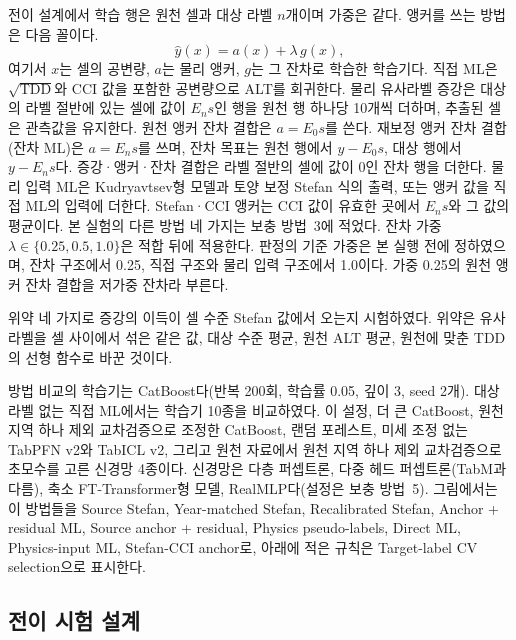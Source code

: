 전이 설계에서 학습 행은 원천 셀과 대상 라벨 $n$개이며 가중은 같다. 앵커를 쓰는 방법은 다음 꼴이다.
\begin{equation}
\hat{y}(x) = a(x) + \lambda\, g(x),
\label{eq:anchor}
\end{equation}
여기서 $x$는 셀의 공변량, $a$는 물리 앵커, $g$는 그 잔차로 학습한 학습기다. 직접 ML은 $\sqrt{\mathrm{TDD}}$와 CCI 값을 포함한 공변량으로 ALT를 회귀한다. 물리 유사라벨 증강은 대상의 라벨 절반에 있는 셀에 값이 $E_n s$인 행을 원천 행 하나당 10개씩 더하며, 추출된 셀은 관측값을 유지한다. 원천 앵커 잔차 결합은 $a = E_0 s$를 쓴다. 재보정 앵커 잔차 결합(잔차 ML)은 $a = E_n s$를 쓰며, 잔차 목표는 원천 행에서 $y - E_0 s$, 대상 행에서 $y - E_n s$다. 증강·앵커·잔차 결합은 라벨 절반의 셀에 값이 0인 잔차 행을 더한다. 물리 입력 ML은 Kudryavtsev형 모델\cite{Kudryavtsev1974}과 토양 보정 Stefan 식의 출력, 또는 앵커 값을 직접 ML의 입력에 더한다. Stefan·CCI 앵커는 CCI 값이 유효한 곳에서 $E_n s$와 그 값의 평균이다. 본 실험의 다른 방법 네 가지는 보충 방법~3에 적었다. 잔차 가중 $\lambda \in \{0.25, 0.5, 1.0\}$은 적합 뒤에 적용한다. 판정의 기준 가중은 본 실행 전에 정하였으며, 잔차 구조에서 0.25, 직접 구조와 물리 입력 구조에서 1.0이다. 가중 0.25의 원천 앵커 잔차 결합을 저가중 잔차라 부른다.

위약 네 가지로 증강의 이득이 셀 수준 Stefan 값에서 오는지 시험하였다. 위약은 유사라벨을 셀 사이에서 섞은 같은 값, 대상 수준 평균, 원천 ALT 평균, 원천에 맞춘 TDD의 선형 함수로 바꾼 것이다.

방법 비교의 학습기는 CatBoost\cite{Prokhorenkova2018}다(반복 200회, 학습률 0.05, 깊이 3, seed 2개). 대상 라벨 없는 직접 ML에서는 학습기 10종을 비교하였다. 이 설정, 더 큰 CatBoost, 원천 지역 하나 제외 교차검증으로 조정한 CatBoost, 랜덤 포레스트, 미세 조정 없는 TabPFN v2\cite{Hollmann2025}와 TabICL v2\cite{Qu2026}, 그리고 원천 자료에서 원천 지역 하나 제외 교차검증으로 초모수를 고른 신경망 4종이다\cite{BergstraBengio2012,CawleyTalbot2010}. 신경망은 다층 퍼셉트론, 다중 헤드 퍼셉트론(TabM\cite{Gorishniy2025}과 다름), 축소 FT-Transformer형 모델\cite{Gorishniy2021}, RealMLP\cite{Holzmuller2024}다(설정은 보충 방법~5). 그림에서는 이 방법들을 Source Stefan, Year-matched Stefan, Recalibrated Stefan, Anchor + residual ML, Source anchor + residual, Physics pseudo-labels, Direct ML, Physics-input ML, Stefan-CCI anchor로, 아래에 적은 규칙은 Target-label CV selection으로 표시한다.

\subsection{전이 시험 설계}\label{sec:m-transfer}

